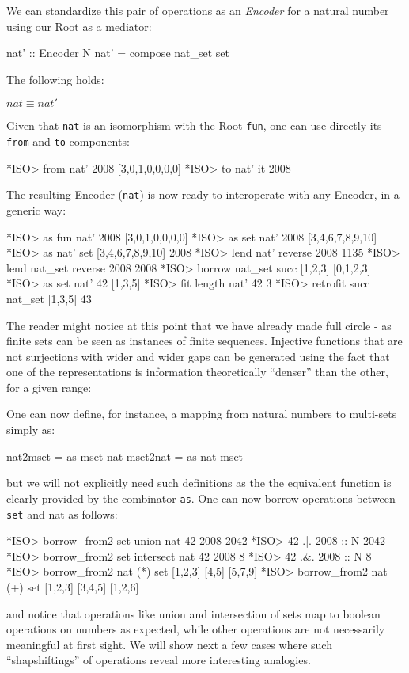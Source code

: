 \documentclass[]{INCLUDES/llncs}
\begin{document}
We can standardize this pair of operations as an {\em Encoder} 
for a natural number using our Root as a mediator: 
\begin{code}
nat' :: Encoder N
nat' = compose nat_set set
\end{code}
The following holds:
\begin{prop}
$nat \equiv nat'$
\end{prop}
Given that {\tt nat} is an isomorphism with the Root {\tt fun}, one can use
directly its {\tt from} and {\tt to} components:
\begin{codex}
*ISO> from nat' 2008
[3,0,1,0,0,0,0]
*ISO> to nat' it
2008
\end{codex}
The resulting Encoder ({\tt nat}) is now ready to interoperate 
with any Encoder, in a generic way:
\begin{codex}
*ISO> as fun nat' 2008
[3,0,1,0,0,0,0]
*ISO> as set nat' 2008
[3,4,6,7,8,9,10]
*ISO> as nat' set [3,4,6,7,8,9,10]
2008
*ISO> lend nat' reverse 2008
1135
*ISO> lend nat_set reverse 2008
2008
*ISO> borrow nat_set succ [1,2,3]
[0,1,2,3]
*ISO> as set nat' 42
[1,3,5]
*ISO> fit length nat' 42
3
*ISO> retrofit succ nat_set [1,3,5]
43
\end{codex}
The reader might notice at this point that we have
already made full circle - as finite sets can be seen as
instances of finite sequences. 
Injective functions that are not surjections with wider and wider gaps can be
generated using the fact that one of the representations is information theoretically
``denser'' than the other, for a given range:
One can now define, for instance, a mapping from natural numbers to multi-sets
simply as:
\begin{code}
nat2mset = as mset nat
mset2nat = as nat mset 
\end{code}
but we will not explicitly need such definitions as the the equivalent
function is clearly provided by the combinator {\tt as}.
One can now borrow operations between {\tt set} and {nat} as follows:
\begin{codex}
*ISO> borrow_from2 set union nat 42 2008
2042
*ISO> 42 .|. 2008 :: N
2042
*ISO> borrow_from2 set intersect nat 42 2008
8
*ISO> 42 .&. 2008 :: N
8
*ISO> borrow_from2 nat (*) set [1,2,3] [4,5]
[5,7,9]
*ISO> borrow_from2 nat (+) set [1,2,3] [3,4,5]
[1,2,6]
\end{codex}
and notice that operations like union and intersection of sets map to boolean
operations on numbers as expected, while other operations are not necessarily
meaningful at first sight. We will show next a few cases where such
``shapshiftings'' of operations reveal more interesting analogies.
\end{document}
